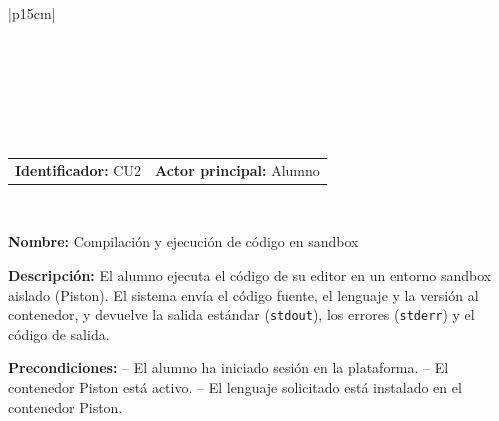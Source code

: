 \begingroup
{} %
\setlength{\arrayrulewidth}{1pt}
\begin{longtable}{|p{15cm}|}
  
  \hline
   \\
  \hline
  \endfirsthead
  
   \\
  \hline
   \\
  \hline
  \endhead
  
  \hline {} \\ \hline
  \endfoot
  
  \hline
  \caption{Caso de Uso CU2 — Compilación y Ejecución de Código en Piston.}
  \label{TB:CU2_PISTON}
  \endlastfoot

  \begin{tabularx}{\linewidth}{@{}X X@{}}
    \textbf{Identificador:} CU2 & \textbf{Actor principal:} Alumno 
  \end{tabularx} \\ \hline

  \textbf{Nombre:} Compilación y ejecución de código en sandbox \\ \hline

  \textbf{Descripción:} \newline 
  El alumno ejecuta el código de su editor en un entorno sandbox aislado (Piston). El sistema envía el código fuente, el lenguaje y la versión al contenedor, y devuelve la salida estándar (\texttt{stdout}), los errores (\texttt{stderr}) y el código de salida. \\ \hline

  \textbf{Precondiciones:} \newline
  -- El alumno ha iniciado sesión en la plataforma. \newline
  -- El contenedor Piston está activo. \newline
  -- El lenguaje solicitado está instalado en el contenedor Piston. \\ \hline


\end{longtable}

